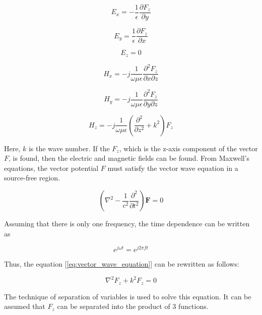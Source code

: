 \documentclass[a4paper,12pt]{report}
\begin{document}
\begin{equation}
  E_x = -\frac{1}{\epsilon}\frac{\partial F_z}{\partial y}
\end{equation}

\begin{equation}
  E_y = \frac{1}{\epsilon}\frac{\partial F_z}{\partial x}
\end{equation}

\begin{equation}
  E_z = 0
\end{equation}

\begin{equation}
  H_x = -j\frac{1}{\omega\mu\epsilon}\frac{\partial^2F_z}{\partial x \partial z}
\end{equation}

\begin{equation}
  H_y = -j\frac{1}{\omega\mu\epsilon}\frac{\partial^2F_z}{\partial y \partial z}
\end{equation}

\begin{equation}
  H_z = -j\frac{1}{\omega\mu\epsilon}(\frac{\partial^2}{\partial z^2} + k^2)F_z
\end{equation}

Here, $k$ is the wave number.
If the $F_z$, which is the z-axis component of the vector $F$, is found,
then the electric and magnetic fields can be found.
From Maxwell's equations, the vector potential $F$ must satisfy the vector wave equation
in a source-free region.

\begin{equation} \label{eq:vector_wave_equation}
  (\nabla^2 - \frac{1}{c^2}\frac{\partial^2}{\partial t^2})\boldsymbol{F} = 0
\end{equation}

Assuming that there is only one frequency, the time dependence can be written as

\begin{equation}
  e^{j\omega t} = e^{j 2\pi ft}
\end{equation}

Thus, the equation [\ref{eq:vector_wave_equation}] can be rewritten as follows:

\begin{equation} \label{eq:simplified}
  \nabla ^ 2 F_z + k^2 F_z = 0
\end{equation}

The technique of separation of variables is used to solve this equation.
It can be assumed that $F_z$ can be separated into the product of 3 functions.
\end{document}
